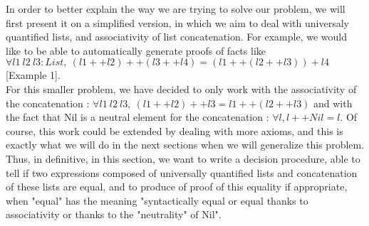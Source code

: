 \documentclass{sigplanconf}
\begin{document}
In order to better explain the way we are trying to solve our problem, we will first present it on a simplified version, in which we aim to deal with universaly quantified lists, and associativity of list concatenation.
For example, we would like to be able to automatically generate proofs of facts like $\forall l1\ l2\ l3 : List,\ (l1 ++ l2) ++ (l3 ++ l4) = (l1 ++ (l2 ++ l3)) + l4$ [Example 1]. \\
For this smaller problem, we have decided to only work with the associativity of the concatenation : $\forall l1\ l2\ l3,\ (l1 ++ l2) ++ l3 = l1 ++ (l2 ++ l3)$ and with the fact that Nil is a neutral element for the concatenation : $\forall l, l ++ Nil = l$. Of course, this work could be extended by dealing with more axioms, and this is exactly what we will do in the next sections when we will generalize this problem. \\
Thus, in definitive, in this section, we want to write a decision procedure, able to tell if two expressions composed of universally quantified lists and concatenation of these lists are equal, and to produce of proof of this equality if appropriate, when "equal" has the meaning "syntactically equal or equal thanks to associativity or thanks to the "neutrality" of Nil". \\
\end{document}
